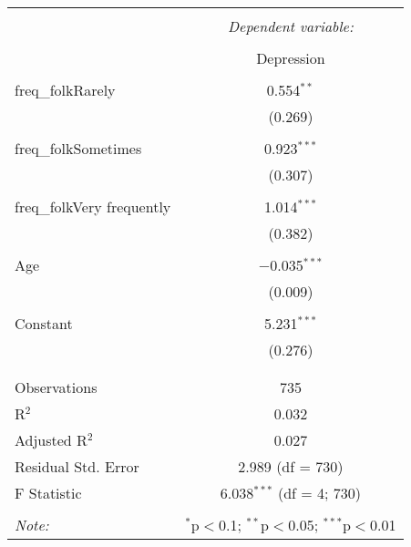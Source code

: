 \documentclass{article}
\begin{document}
\begin{table}[!htbp] \centering 
  \caption{} 
  \label{} 
\begin{tabular}{@{\extracolsep{5pt}}lc} 
\\[-1.8ex]\hline 
\hline \\[-1.8ex] 
 & \multicolumn{1}{c}{\textit{Dependent variable:}} \\ 
\cline{2-2} 
\\[-1.8ex] & Depression \\ 
\hline \\[-1.8ex] 
 freq\_folkRarely & 0.554$^{**}$ \\ 
  & (0.269) \\ 
  & \\ 
 freq\_folkSometimes & 0.923$^{***}$ \\ 
  & (0.307) \\ 
  & \\ 
 freq\_folkVery frequently & 1.014$^{***}$ \\ 
  & (0.382) \\ 
  & \\ 
 Age & $-$0.035$^{***}$ \\ 
  & (0.009) \\ 
  & \\ 
 Constant & 5.231$^{***}$ \\ 
  & (0.276) \\ 
  & \\ 
\hline \\[-1.8ex] 
Observations & 735 \\ 
R$^{2}$ & 0.032 \\ 
Adjusted R$^{2}$ & 0.027 \\ 
Residual Std. Error & 2.989 (df = 730) \\ 
F Statistic & 6.038$^{***}$ (df = 4; 730) \\ 
\hline 
\hline \\[-1.8ex] 
\textit{Note:}  & \multicolumn{1}{r}{$^{*}$p$<$0.1; $^{**}$p$<$0.05; $^{***}$p$<$0.01} \\ 
\end{tabular} 
\end{table}
\end{document}
